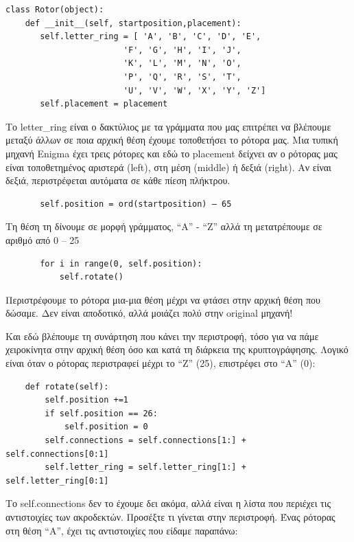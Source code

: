\documentclass[a4paper,twoside,12pt]{article}
\begin{document}
\begin{verbatim}
class Rotor(object):
    def __init__(self, startposition,placement):
       self.letter_ring = [ 'A', 'B', 'C', 'D', 'E',
                        'F', 'G', 'H', 'I', 'J',
                        'K', 'L', 'M', 'N', 'O',
                        'P', 'Q', 'R', 'S', 'T',
                        'U', 'V', 'W', 'X', 'Y', 'Z']
       self.placement = placement
\end{verbatim}

Το letter\_ring είναι ο δακτύλιος με τα γράμματα που μας επιτρέπει να βλέπουμε μεταξύ άλλων σε ποια αρχική θέση έχουμε τοποθετήσει το ρότορα μας. Μια τυπική μηχανή Enigma έχει τρεις ρότορες και εδώ το placement δείχνει αν ο ρότορας μας είναι τοποθετημένος αριστερά (left), στη μέση (middle) ή δεξιά (right). Αν είναι δεξιά, περιστρέφεται αυτόματα σε κάθε πίεση πλήκτρου.

\begin{verbatim}
       self.position = ord(startposition) – 65
\end{verbatim}

Τη θέση τη δίνουμε σε μορφή γράμματος, “Α” - “Ζ” αλλά τη μετατρέπουμε σε αριθμό από 0 – 25

\begin{verbatim}
       for i in range(0, self.position):
           self.rotate()
\end{verbatim}

Περιστρέφουμε το ρότορα μια-μια θέση μέχρι να φτάσει στην αρχική θέση που δώσαμε. Δεν είναι αποδοτικό, αλλά μοιάζει πολύ στην original μηχανή!

Και εδώ βλέπουμε τη συνάρτηση που κάνει την περιστροφή, τόσο για να πάμε χειροκίνητα στην αρχική θέση όσο και κατά τη διάρκεια της κρυπτογράφησης. Λογικό είναι όταν ο ρότορας περιστραφεί μέχρι το “Z” (25), επιστρέφει στο “Α” (0):

\small
\begin{verbatim}
    def rotate(self):
        self.position +=1
        if self.position == 26:
            self.position = 0
        self.connections = self.connections[1:] + self.connections[0:1]
        self.letter_ring = self.letter_ring[1:] + self.letter_ring[0:1]
\end{verbatim}
\normalsize

Το self.connections δεν το έχουμε δει ακόμα, αλλά είναι η λίστα που περιέχει τις αντιστοιχίες των ακροδεκτών. Προσέξτε τι γίνεται στην περιστροφή. Ένας ρότορας στη θέση “Α”, έχει τις αντιστοιχίες που είδαμε παραπάνω:
\end{document}
